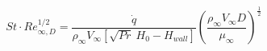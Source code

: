 \documentclass[%
 aip,
 amsmath,amssymb,
preprint,%
]{revtex4-1}
\begin{document}
\begin{equation}
    St\cdot Re_{\infty,D}^{1/2} = \frac{\dot{q}} {\rho_\infty V_\infty \left[\sqrt{Pr}~ H_0 - H_{wall}\right] } \left(\frac{\rho_\infty V_\infty D}{\mu_\infty}\right)^{\frac{1}{2}}
    \label{lam_param}
\end{equation}


\end{document}
